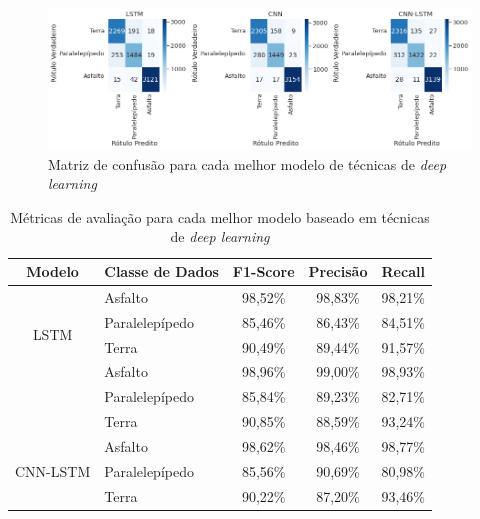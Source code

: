\begin{figure}[H]
  \centering
  \caption{Matriz de confusão para cada melhor modelo de técnicas de \textit{deep learning}}
  \label{fig:confusion_matrix_deep_tipo_superficie_1}
  \includegraphics[width=1\textwidth]{figuras/fig_35.png}
\end{figure}

\begin{table}[H]
\scriptsize
\centering
\caption{Métricas de avaliação para cada melhor modelo baseado em técnicas de \textit{deep learning}} 
\label{table:deep_ml_metrics_tipo_superficie_1}
\begin{tabular}{clccc}
\toprule
\textbf{Modelo} & \multicolumn{1}{c}{\textbf{Classe de Dados}} & \textbf{F1-Score} & \textbf{Precisão} & \textbf{Recall} \\ \midrule
\multirow{4}{*}{LSTM} & Asfalto & 98,52\% & 98,83\% & 98,21\% \\ \cmidrule(l){2-5} 
 & Paralelepípedo & 85,46\% & 86,43\% & 84,51\% \\ \cmidrule(l){2-5} 
 & Terra & 90,49\% & 89,44\% & 91,57\% \\ \midrule
\multirow{4}{*}{CNN} & Asfalto & 98,96\% & 99,00\% & 98,93\% \\ \cmidrule(l){2-5} 
 & Paralelepípedo & 85,84\% & 89,23\% & 82,71\% \\ \cmidrule(l){2-5} 
 & Terra & 90,85\% & 88,59\% & 93,24\% \\ \midrule
\multirow{4}{*}{CNN-LSTM} & Asfalto & 98,62\% & 98,46\% & 98,77\% \\ \cmidrule(l){2-5} 
 & Paralelepípedo & 85,56\% & 90,69\% & 80,98\% \\ \cmidrule(l){2-5} 
 & Terra & 90,22\% & 87,20\% & 93,46\% \\ \bottomrule
\end{tabular}
\end{table}

